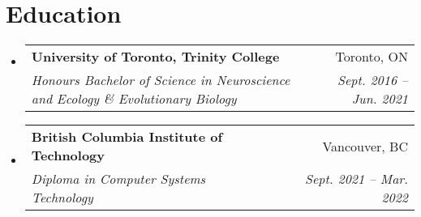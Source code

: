 \documentclass[letterpaper,10pt]{article}
\makeatletter
\newcommand{\resumeSubheading}[4]{
  \vspace{-2pt}\item
    \begin{tabular*}{0.97\textwidth}[t]{l@{\extracolsep{\fill}}r}
      \textbf{#1} & #2 \\
      \textit{\small#3} & \textit{\small #4} \\
    \end{tabular*}\vspace{-5pt} %
}
\newcommand{\resumeSubHeadingListStart}{\begin{itemize}[leftmargin=0.15in, label={}]}
\newcommand{\resumeSubHeadingListEnd}{\end{itemize}}
\makeatother
\begin{document}
    
\section{Education}
  \resumeSubHeadingListStart
    \resumeSubheading
      {University of Toronto, Trinity College}{Toronto, ON}
      {Honours Bachelor of Science in Neuroscience and Ecology \& Evolutionary Biology}{Sept. 2016 -- Jun. 2021}
      
      
     \resumeSubheading
      {British Columbia Institute of Technology} {Vancouver, BC}
      {Diploma in Computer Systems Technology}{Sept. 2021 -- Mar. 2022}
 
  \resumeSubHeadingListEnd
\end{document}
